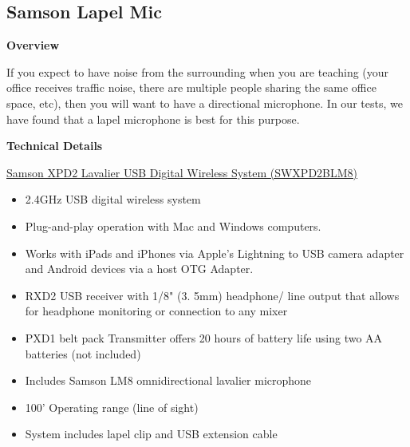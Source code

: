 \begin{gram}
\end{gram}

\begin{gram}
\end{gram}

\subsection{Samson Lapel Mic}

\begin{gram}

\textbf{Overview}

If you expect to have noise from the surrounding when you are teaching
(your office receives traffic noise, there are multiple people sharing
the same office space, etc), then you will want to have a
directional microphone.  
%
In our tests, we have found that a lapel microphone is best for this purpose.
%


\textbf{Technical Details}

\href{http://www.samsontech.com/samson/products/wireless-systems/xpd-series/xpd2lav/}
{Samson XPD2 Lavalier USB Digital Wireless System (SWXPD2BLM8)}

\begin{itemize}
\item 2.4GHz USB digital wireless system
\item Plug-and-play operation with Mac and Windows computers. 
\item Works with iPads and iPhones via Apple's Lightning to USB camera adapter and Android devices via a host OTG Adapter.

\item RXD2 USB receiver with 1/8" (3. 5mm) headphone/ line output that allows for headphone monitoring or connection to any mixer
\item PXD1 belt pack Transmitter offers 20 hours of battery life using two AA batteries (not included)
\item Includes Samson LM8 omnidirectional lavalier microphone
\item 100' Operating range (line of sight)
\item System includes lapel clip and USB extension cable
\end{itemize}


\end{gram}
